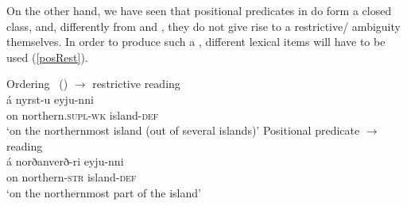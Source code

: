 \documentclass[output=paper,colorlinks,citecolor=brown]{langscibook}
\begin{document}
On the other hand, we have seen that positional predicates in  do form a closed class, and, differently from  and , they do not give rise to a restrictive/ ambiguity themselves.  In order to produce such a , different lexical items will have to be used (\ref{posRest}).

\begin{exe}
   \ex \label{posRest}
     \begin{xlist}
         \ex  \label{posResta} Ordering  \ () \hfill $\rightarrow$ restrictive reading  \\ 
            \gll á nyrst-u  eyju-nni   \\ 
              on northern.\textsc{supl-wk}  island-\textsc{def}    \\
              \glt `on the northernmost island (out of several islands)'
         \ex  \label{posRestb} Positional predicate \hfill $\rightarrow$  reading  \\  
         \gll á norðanverð-ri eyju-nni   \\ 
           on  northern-\textsc{str}  island-\textsc{def}   \\
           \glt `on the northernmost part of the  island'  
     \end{xlist}
\end{exe} 
\end{document}

